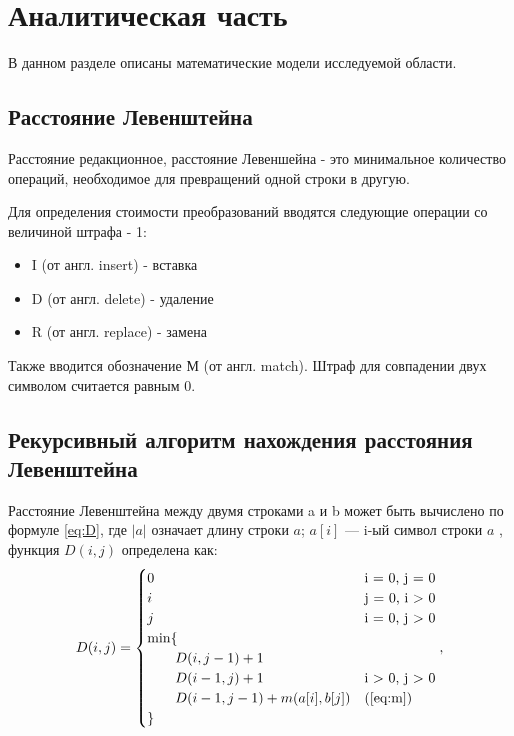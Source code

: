 \chapter{Аналитическая часть}

    В данном разделе описаны математические модели исследуемой области.

    \section{Расстояние Левенштейна}

    Расстояние редакционное, расстояние Левеншейна - это минимальное
    количество операций, необходимое для превращений одной строки в другую.
    
    Для определения стоимости преобразований вводятся следующие операции
    со величиной штрафа - 1:
    
    \begin{itemize}
        \item I (от англ. insert) - вставка
        \item D (от англ. delete) - удаление
        \item R (от англ. replace) - замена
    \end{itemize}
    
    Также вводится обозначение М (от англ. match). Штраф для совпадении двух
    символом считается равным 0.
    
    \section{Рекурсивный алгоритм нахождения расстояния Левенштейна}
        
        Расстояние Левенштейна между двумя строками a и b может быть вычислено по формуле \ref{eq:D}, где $|a|$ означает длину строки $a$; $a[i]$ — i-ый символ строки $a$ , функция $D(i, j)$ определена как:
        \begin{equation}
        	\label{eq:D}
        	D(i, j) = \begin{cases}
        		0 &\text{i = 0, j = 0}\\
        		i &\text{j = 0, i > 0}\\
        		j &\text{i = 0, j > 0}\\
        		\min \lbrace \\
        			\qquad D(i, j-1) + 1\\
        			\qquad D(i-1, j) + 1 &\text{i > 0, j > 0}\\
        			\qquad D(i-1, j-1) + m(a[i], b[j]) &\text(\ref{eq:m})\\
        		\rbrace
        	\end{cases},
        \end{equation}
        
